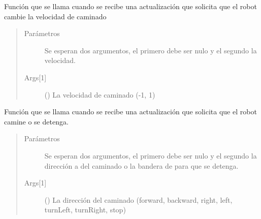
\begin{fulllineitems}
\label{\detokenize{nao_firebase:fire_nao.set_velocity}}
Función que se llama cuando se recibe una actualización que solicita
que el robot cambie la velocidad de caminado
\begin{quote}\begin{description}
\item[{Parámetros}] \leavevmode
{} \textendash{} Se esperan dos argumentos, el primero debe ser nulo y el segundo la velocidad.

\item[{Args{[}1{]}}] \leavevmode
() La velocidad de caminado (-1, 1)

\end{description}\end{quote}

\end{fulllineitems}


\begin{fulllineitems}
\label{\detokenize{nao_firebase:fire_nao.walk}}
Función que se llama cuando se recibe una actualización que solicita
que el robot camine o se detenga.
\begin{quote}\begin{description}
\item[{Parámetros}] \leavevmode
{} \textendash{} Se esperan dos argumentos, el primero debe ser nulo y el segundo la dirección a del caminado o la bandera de  para que se detenga.

\item[{Args{[}1{]}}] \leavevmode
() La dirección del caminado (forward, backward, right, left, turnLeft, turnRight, stop)

\end{description}\end{quote}

\end{fulllineitems}
